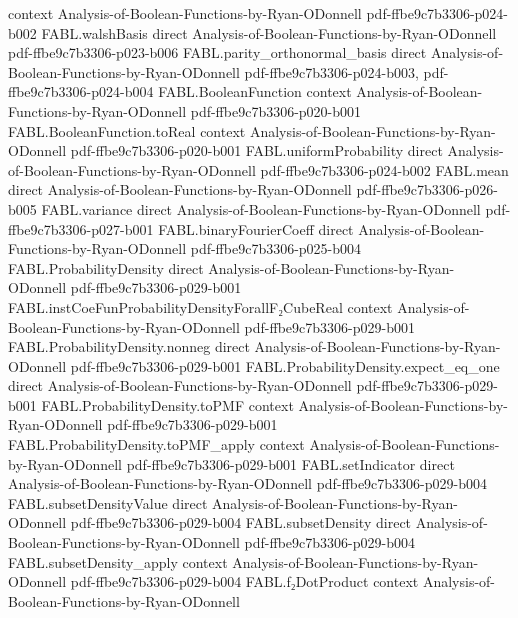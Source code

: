 \begin{theorem}
  {context}
  {Analysis-of-Boolean-Functions-by-Ryan-ODonnell}
  {pdf-ffbe9c7b3306-p024-b002}
\proofstep
  {FABL.walshBasis}
  {direct}
  {Analysis-of-Boolean-Functions-by-Ryan-ODonnell}
  {pdf-ffbe9c7b3306-p023-b006}
\proofstep
  {FABL.parity_orthonormal_basis}
  {direct}
  {Analysis-of-Boolean-Functions-by-Ryan-ODonnell}
  {pdf-ffbe9c7b3306-p024-b003,
    pdf-ffbe9c7b3306-p024-b004}
\proofstep
  {FABL.BooleanFunction}
  {context}
  {Analysis-of-Boolean-Functions-by-Ryan-ODonnell}
  {pdf-ffbe9c7b3306-p020-b001}
\proofstep
  {FABL.BooleanFunction.toReal}
  {context}
  {Analysis-of-Boolean-Functions-by-Ryan-ODonnell}
  {pdf-ffbe9c7b3306-p020-b001}
\proofstep
  {FABL.uniformProbability}
  {direct}
  {Analysis-of-Boolean-Functions-by-Ryan-ODonnell}
  {pdf-ffbe9c7b3306-p024-b002}
\proofstep
  {FABL.mean}
  {direct}
  {Analysis-of-Boolean-Functions-by-Ryan-ODonnell}
  {pdf-ffbe9c7b3306-p026-b005}
\proofstep
  {FABL.variance}
  {direct}
  {Analysis-of-Boolean-Functions-by-Ryan-ODonnell}
  {pdf-ffbe9c7b3306-p027-b001}
\proofstep
  {FABL.binaryFourierCoeff}
  {direct}
  {Analysis-of-Boolean-Functions-by-Ryan-ODonnell}
  {pdf-ffbe9c7b3306-p025-b004}
\proofstep
  {FABL.ProbabilityDensity}
  {direct}
  {Analysis-of-Boolean-Functions-by-Ryan-ODonnell}
  {pdf-ffbe9c7b3306-p029-b001}
\proofstep
  {FABL.instCoeFunProbabilityDensityForallF₂CubeReal}
  {context}
  {Analysis-of-Boolean-Functions-by-Ryan-ODonnell}
  {pdf-ffbe9c7b3306-p029-b001}
\proofstep
  {FABL.ProbabilityDensity.nonneg}
  {direct}
  {Analysis-of-Boolean-Functions-by-Ryan-ODonnell}
  {pdf-ffbe9c7b3306-p029-b001}
\proofstep
  {FABL.ProbabilityDensity.expect_eq_one}
  {direct}
  {Analysis-of-Boolean-Functions-by-Ryan-ODonnell}
  {pdf-ffbe9c7b3306-p029-b001}
\proofstep
  {FABL.ProbabilityDensity.toPMF}
  {context}
  {Analysis-of-Boolean-Functions-by-Ryan-ODonnell}
  {pdf-ffbe9c7b3306-p029-b001}
\proofstep
  {FABL.ProbabilityDensity.toPMF_apply}
  {context}
  {Analysis-of-Boolean-Functions-by-Ryan-ODonnell}
  {pdf-ffbe9c7b3306-p029-b001}
\proofstep
  {FABL.setIndicator}
  {direct}
  {Analysis-of-Boolean-Functions-by-Ryan-ODonnell}
  {pdf-ffbe9c7b3306-p029-b004}
\proofstep
  {FABL.subsetDensityValue}
  {direct}
  {Analysis-of-Boolean-Functions-by-Ryan-ODonnell}
  {pdf-ffbe9c7b3306-p029-b004}
\proofstep
  {FABL.subsetDensity}
  {direct}
  {Analysis-of-Boolean-Functions-by-Ryan-ODonnell}
  {pdf-ffbe9c7b3306-p029-b004}
\proofstep
  {FABL.subsetDensity_apply}
  {context}
  {Analysis-of-Boolean-Functions-by-Ryan-ODonnell}
  {pdf-ffbe9c7b3306-p029-b004}
\proofstep
  {FABL.f₂DotProduct}
  {context}
  {Analysis-of-Boolean-Functions-by-Ryan-ODonnell}

\end{theorem}
